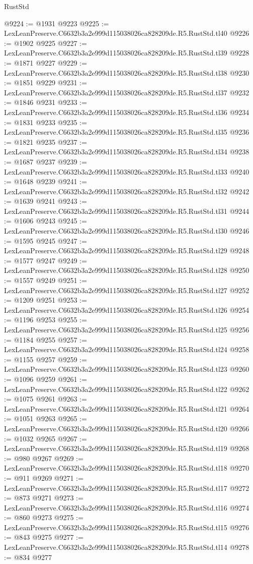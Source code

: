 \begin{lexlean}{RustStd}
\begin{coremodule}
@9224 := @1931 @9223
@9225 := LexLeanPreserve.C6632b3a2e999d115038026ca828209de.R5.RustStd.tl40
@9226 := @1902 @9225
@9227 := LexLeanPreserve.C6632b3a2e999d115038026ca828209de.R5.RustStd.tl39
@9228 := @1871 @9227
@9229 := LexLeanPreserve.C6632b3a2e999d115038026ca828209de.R5.RustStd.tl38
@9230 := @1851 @9229
@9231 := LexLeanPreserve.C6632b3a2e999d115038026ca828209de.R5.RustStd.tl37
@9232 := @1846 @9231
@9233 := LexLeanPreserve.C6632b3a2e999d115038026ca828209de.R5.RustStd.tl36
@9234 := @1831 @9233
@9235 := LexLeanPreserve.C6632b3a2e999d115038026ca828209de.R5.RustStd.tl35
@9236 := @1821 @9235
@9237 := LexLeanPreserve.C6632b3a2e999d115038026ca828209de.R5.RustStd.tl34
@9238 := @1687 @9237
@9239 := LexLeanPreserve.C6632b3a2e999d115038026ca828209de.R5.RustStd.tl33
@9240 := @1648 @9239
@9241 := LexLeanPreserve.C6632b3a2e999d115038026ca828209de.R5.RustStd.tl32
@9242 := @1639 @9241
@9243 := LexLeanPreserve.C6632b3a2e999d115038026ca828209de.R5.RustStd.tl31
@9244 := @1606 @9243
@9245 := LexLeanPreserve.C6632b3a2e999d115038026ca828209de.R5.RustStd.tl30
@9246 := @1595 @9245
@9247 := LexLeanPreserve.C6632b3a2e999d115038026ca828209de.R5.RustStd.tl29
@9248 := @1577 @9247
@9249 := LexLeanPreserve.C6632b3a2e999d115038026ca828209de.R5.RustStd.tl28
@9250 := @1557 @9249
@9251 := LexLeanPreserve.C6632b3a2e999d115038026ca828209de.R5.RustStd.tl27
@9252 := @1209 @9251
@9253 := LexLeanPreserve.C6632b3a2e999d115038026ca828209de.R5.RustStd.tl26
@9254 := @1196 @9253
@9255 := LexLeanPreserve.C6632b3a2e999d115038026ca828209de.R5.RustStd.tl25
@9256 := @1184 @9255
@9257 := LexLeanPreserve.C6632b3a2e999d115038026ca828209de.R5.RustStd.tl24
@9258 := @1155 @9257
@9259 := LexLeanPreserve.C6632b3a2e999d115038026ca828209de.R5.RustStd.tl23
@9260 := @1096 @9259
@9261 := LexLeanPreserve.C6632b3a2e999d115038026ca828209de.R5.RustStd.tl22
@9262 := @1075 @9261
@9263 := LexLeanPreserve.C6632b3a2e999d115038026ca828209de.R5.RustStd.tl21
@9264 := @1051 @9263
@9265 := LexLeanPreserve.C6632b3a2e999d115038026ca828209de.R5.RustStd.tl20
@9266 := @1032 @9265
@9267 := LexLeanPreserve.C6632b3a2e999d115038026ca828209de.R5.RustStd.tl19
@9268 := @980 @9267
@9269 := LexLeanPreserve.C6632b3a2e999d115038026ca828209de.R5.RustStd.tl18
@9270 := @911 @9269
@9271 := LexLeanPreserve.C6632b3a2e999d115038026ca828209de.R5.RustStd.tl17
@9272 := @873 @9271
@9273 := LexLeanPreserve.C6632b3a2e999d115038026ca828209de.R5.RustStd.tl16
@9274 := @860 @9273
@9275 := LexLeanPreserve.C6632b3a2e999d115038026ca828209de.R5.RustStd.tl15
@9276 := @843 @9275
@9277 := LexLeanPreserve.C6632b3a2e999d115038026ca828209de.R5.RustStd.tl14
@9278 := @834 @9277

\end{coremodule}
\end{lexlean}
